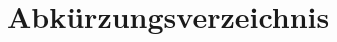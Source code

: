 \documentclass[../../main.tex]{subfiles}
\begin{document}

{}
\section*{Abkürzungsverzeichnis}


\begin{acronym}[Bsp] %

\end{acronym}
\end{document}
